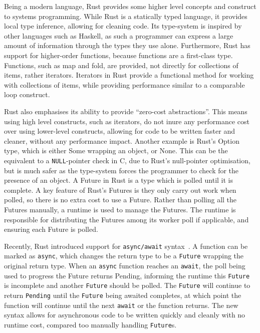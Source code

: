 Being a modern language, Rust provides some higher level concepts and construct to systems programming.
While Rust is a statically typed language, it provides local type inference, allowing for cleaning code.
Its type-system is inspired by other languages such as Haskell, as such a programmer can express a large amount of
information through the types they use alone.
Furthermore, Rust has support for higher-order functions, because functions are a first-class type.
Functions, such as map and fold, are provided, not directly for collections of items, rather iterators.
Iterators in Rust provide a functional method for working with collections of items, while providing performance similar
to a comparable loop construct.

Rust also emphasises its ability to provide “zero-cost abstractions”.
This means using high level constructs, such as iterators, do not inure any performance cost over using lower-level
constructs, allowing for code to be written faster and cleaner, without any performance impact.
Another example is Rust's Option type, which is either Some wrapping an object, or None.
This can be the equivalent to a \texttt{NULL}-pointer check in C, due to Rust's null-pointer optimisation, but is much
safer as the type-system forces the programmer to check for the presence of an object.
A Future in Rust is a type which is polled until it is complete.
A key feature of Rust's Futures is they only carry out work when polled, so there is no extra cost to use a Future.
Rather than polling all the Futures manually, a runtime is used to manage the Futures.
The runtime is responsible for distributing the Futures among its worker poll if applicable, and ensuring each Future is
polled.

Recently, Rust introduced support for \texttt{async/await} syntax~\citep{withoutboats_asyncawaitnotation_}.
A function can be marked as \texttt{async}, which changes the return type to be a \texttt{Future} wrapping the original
return type.
When an \texttt{async} function reaches an \texttt{await}, the poll being used to progress the Future returns Pending,
informing the runtime this \texttt{Future} is incomplete and another \texttt{Future} should be polled.
The \texttt{Future} will continue to return \texttt{Pending} until the \texttt{Future} being awaited completes,
at which point the function will continue until the next \texttt{await} or the function returns.
The new syntax allows for asynchronous code to be written quickly and cleanly with no runtime cost, compared too
manually handling \texttt{Future}s.

